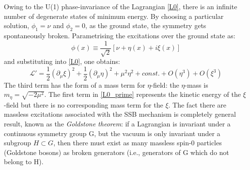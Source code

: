 Owing to the U(1) phase-invariance of the Lagrangian \ref{L0}, there is an infinite number of degenerate states of minimum energy. 
By choosing a particular solution, $\phi_{1} = \nu$ and $\phi_{2} = 0$, as the ground state, the symmetry gets spontaneously broken. Parametrising the excitations over the ground state as:
\begin{equation}
\phi(x) \equiv \frac{1}{\sqrt{2}}[\nu+\eta(x)+i\xi(x)]
\label{phi_expansion}
\end{equation}
and substituting into \ref{L0}, one obtains:
\begin{equation}
\mathcal{L'} = \frac{1}{2}(\partial_{\mu}\xi)^{2} + \frac{1}{2}(\partial_{\mu}\eta)^{2} + \mu^{2}\eta^{2} + const. + O(\eta^{3})+O(\xi^{3})
\label{L0_prime}
\end{equation}
The third term has the form of a mass term for $\eta$-field: the $\eta$-mass is $m_{\eta} = \sqrt{-2\mu^{2}}$. The first term in \ref{L0_prime} represents the kinetic energy of the $\xi$-field but there is no corresponding mass term for the $\xi$. The fact there are massless excitations associated with the SSB mechanism is completely general result, known as the \textit{Goldstone theorem}: if a Lagrangian is invariant under a continuous symmetry group G, but the vacuum is only invariant under a subgroup $H\subset G$, then there must exist as many massless spin-0 particles (Goldstone bosons) as broken generators (i.e., generators of G which do not belong to H).
